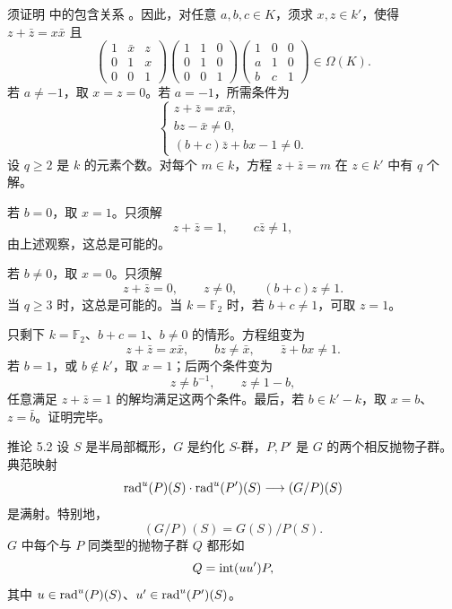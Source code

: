 须证明  中的包含关系 \textup{}。因此，对任意 \(a,b,c\in K\)，须求 \(x,z\in k'\)，使得 \(z+\bar z=x\bar x\) 且
\[
 \begin{pmatrix}1&\bar x&z\\0&1&x\\0&0&1\end{pmatrix}
 \begin{pmatrix}1&1&0\\0&1&0\\0&0&1\end{pmatrix}
 \begin{pmatrix}1&0&0\\a&1&0\\b&c&1\end{pmatrix}
 \in\Omega(K).                                         \tag{3}\label{sga3:xxvi:theorem:5-1:equation:3}
\]
若 \(a\ne-1\)，取 \(x=z=0\)。若 \(a=-1\)，所需条件为
\[
 \begin{cases}
 z+\bar z=x\bar x,\\
 bz-\bar x\ne0,\\
 (b+c)\bar z+bx-1\ne0.
 \end{cases}                                           \tag{4}\label{sga3:xxvi:theorem:5-1:equation:4}
\]
设 \(q\geq2\) 是 \(k\) 的元素个数。对每个 \(m\in k\)，方程 \(z+\bar z=m\) 在 \(z\in k'\) 中有 \(q\) 个解。

若 \(b=0\)，取 \(x=1\)。只须解
\[
 z+\bar z=1,\qquad c\bar z\ne1,
\]
由上述观察，这总是可能的。

若 \(b\ne0\)，取 \(x=0\)。只须解
\[
 z+\bar z=0,\qquad z\ne0,\qquad (b+c)z\ne1.
\]
当 \(q\geq3\) 时，这总是可能的。当 \(k=\mathbb F_2\) 时，若 \(b+c\ne1\)，可取 \(z=1\)。

只剩下 \(k=\mathbb F_2\)、\(b+c=1\)、\(b\ne0\) 的情形。方程组变为
\[
 z+\bar z=x\bar x,\qquad bz\ne\bar x,\qquad
 \bar z+bx\ne1.
\]
若 \(b=1\)，或 \(b\notin k'\)，取 \(x=1\)；后两个条件变为
\[
 z\ne b^{-1},\qquad z\ne1-b,
\]
任意满足 \(z+\bar z=1\) 的解均满足这两个条件。最后，若 \(b\in k'-k\)，取 \(x=b\)、\(z=\bar b\)。证明完毕。
\SGAQED


\begin{sgastatement}{推论 5.2}
设 \(S\) 是半局部概形，\(G\) 是约化 \(S\)-群，\(P,P'\) 是 \(G\) 的两个相反抛物子群。典范映射
\[
 \operatorname{rad}^u(P)(S)\cdot\operatorname{rad}^u(P')(S)\longrightarrow(G/P)(S)
\]
是满射。特别地，
\[
 (G/P)(S)=G(S)/P(S).
\]
\(G\) 中每个与 \(P\) 同类型的抛物子群 \(Q\) 都形如
\[
 Q=\operatorname{int}(uu')P,
\]
其中 \(u\in\operatorname{rad}^u(P)(S)\)、\(u'\in\operatorname{rad}^u(P')(S)\)。
\end{sgastatement}

